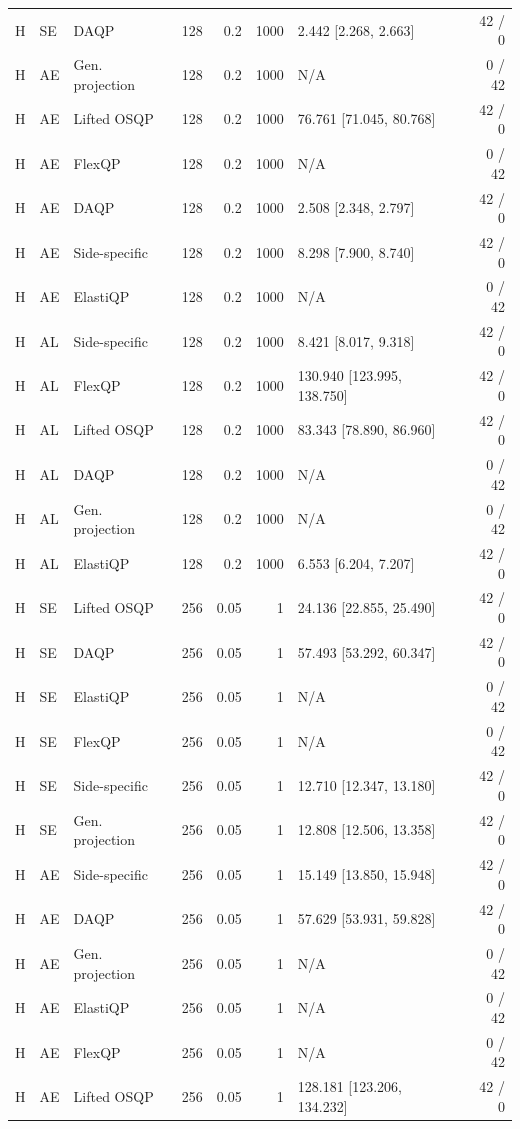 \begin{longtable}{@{}lllrrrlr@{}}
H & SE & DAQP & 128 & 0.2 & 1000 & 2.442 [2.268, 2.663] & 42 / 0 \\
H & AE & Gen. projection & 128 & 0.2 & 1000 & N/A & 0 / 42 \\
H & AE & Lifted OSQP & 128 & 0.2 & 1000 & 76.761 [71.045, 80.768] & 42 / 0 \\
H & AE & FlexQP & 128 & 0.2 & 1000 & N/A & 0 / 42 \\
H & AE & DAQP & 128 & 0.2 & 1000 & 2.508 [2.348, 2.797] & 42 / 0 \\
H & AE & Side-specific & 128 & 0.2 & 1000 & 8.298 [7.900, 8.740] & 42 / 0 \\
H & AE & ElastiQP & 128 & 0.2 & 1000 & N/A & 0 / 42 \\
H & AL & Side-specific & 128 & 0.2 & 1000 & 8.421 [8.017, 9.318] & 42 / 0 \\
H & AL & FlexQP & 128 & 0.2 & 1000 & 130.940 [123.995, 138.750] & 42 / 0 \\
H & AL & Lifted OSQP & 128 & 0.2 & 1000 & 83.343 [78.890, 86.960] & 42 / 0 \\
H & AL & DAQP & 128 & 0.2 & 1000 & N/A & 0 / 42 \\
H & AL & Gen. projection & 128 & 0.2 & 1000 & N/A & 0 / 42 \\
H & AL & ElastiQP & 128 & 0.2 & 1000 & 6.553 [6.204, 7.207] & 42 / 0 \\
H & SE & Lifted OSQP & 256 & 0.05 & 1 & 24.136 [22.855, 25.490] & 42 / 0 \\
H & SE & DAQP & 256 & 0.05 & 1 & 57.493 [53.292, 60.347] & 42 / 0 \\
H & SE & ElastiQP & 256 & 0.05 & 1 & N/A & 0 / 42 \\
H & SE & FlexQP & 256 & 0.05 & 1 & N/A & 0 / 42 \\
H & SE & Side-specific & 256 & 0.05 & 1 & 12.710 [12.347, 13.180] & 42 / 0 \\
H & SE & Gen. projection & 256 & 0.05 & 1 & 12.808 [12.506, 13.358] & 42 / 0 \\
H & AE & Side-specific & 256 & 0.05 & 1 & 15.149 [13.850, 15.948] & 42 / 0 \\
H & AE & DAQP & 256 & 0.05 & 1 & 57.629 [53.931, 59.828] & 42 / 0 \\
H & AE & Gen. projection & 256 & 0.05 & 1 & N/A & 0 / 42 \\
H & AE & ElastiQP & 256 & 0.05 & 1 & N/A & 0 / 42 \\
H & AE & FlexQP & 256 & 0.05 & 1 & N/A & 0 / 42 \\
H & AE & Lifted OSQP & 256 & 0.05 & 1 & 128.181 [123.206, 134.232] & 42 / 0 \\

\end{longtable}
